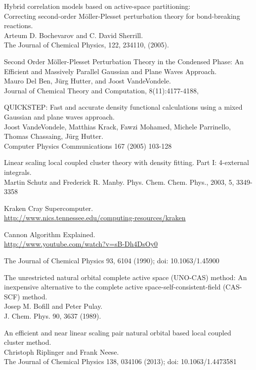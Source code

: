 \documentclass[a4paper,norsk,11pt,twoside]{report}
\begin{document}
\begin{thebibliography}{}
Hybrid correlation models based on active-space partitioning: \\
Correcting second-order M\"oller-Plesset perturbation theory for bond-breaking reactions. \\
Arteum D. Bochevarov and C. David Sherrill. \\
The Journal of Chemical Physics, 122, 234110, (2005).

Second Order M\"oller-Plesset Perturbation Theory in
the Condensed Phase: An Efficient and Massively
Parallel Gaussian and Plane Waves Approach. \\
Mauro Del Ben, J\"urg Hutter, and Joost VandeVondele. \\
Journal of Chemical Theory and Computation, 8(11):4177-4188,

QUICKSTEP: Fast and accurate density functional calculations
using a mixed Gaussian and plane waves approach. \\
Joost VandeVondele, Matthias Krack, Fawzi Mohamed, Michele Parrinello, Thomas Chassaing, J\"urg Hutter.\\
Computer Physics Communications 167 (2005) 103-128

Linear scaling local coupled cluster theory with density fitting.
Part I: 4-external integrals. \\
Martin Schutz and Frederick R. Manby.
Phys. Chem. Chem. Phys., 2003, 5, 3349-3358

Kraken Cray Supercomputer. \\
\url{http://www.nics.tennessee.edu/computing-resources/kraken}

Cannon Algorithm Explained. \\
\url{http://www.youtube.com/watch?v=sB-Dh4DsOy0}

The Journal of Chemical Physics 93, 6104 (1990); doi: 10.1063/1.45900  

The unrestricted natural orbital complete active space (UNO-CAS) method: An inexpensive alternative to the complete active space-self-consistent-field (CAS-SCF) method. \\
Josep M. Bofill and Peter Pulay. \\
J. Chem. Phys. 90, 3637 (1989).

An efficient and near linear scaling pair natural orbital based local coupled cluster method. \\
Christoph Riplinger and Frank Neese. \\
The Journal of Chemical Physics 138, 034106 (2013); doi: 10.1063/1.4473581


\end{thebibliography}
\end{document}
